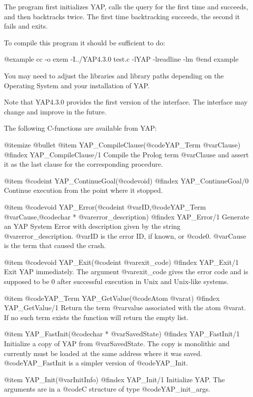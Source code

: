 {{{{{{{{{The program first initializes YAP, calls the query for the
first time and succeeds, and then backtracks twice. The first time
backtracking succeeds, the second it fails and exits.

To compile this program it should be sufficient to do:

@example
cc -o exem -I../YAP4.3.0 test.c -lYAP -lreadline -lm
@end example

You may need to adjust the libraries and library paths depending on the
Operating System and your installation of YAP.

Note that YAP4.3.0 provides the first version of the interface. The
interface may change and improve in the future.

The following C-functions are available from YAP:

@itemize @bullet
@item  YAP_CompileClause(@code{YAP_Term} @var{Clause})
@findex  YAP_CompileClause/1
Compile the Prolog term @var{Clause} and assert it as the last clause
for the corresponding procedure.

@item  @code{int} YAP_ContinueGoal(@code{void})
@findex YAP_ContinueGoal/0
Continue execution from the point where it stopped.

@item  @code{void} YAP_Error(@code{int} @var{ID},@code{YAP_Term} @var{Cause},@code{char *} @var{error_description})
@findex YAP_Error/1
Generate an YAP System Error with description given by the string
@var{error_description}. @var{ID} is the error ID, if known, or
@code{0}. @var{Cause} is the term that caused the crash.

@item  @code{void} YAP_Exit(@code{int} @var{exit_code})
@findex YAP_Exit/1
Exit YAP immediately. The argument @var{exit_code} gives the error code
and is supposed to be 0 after successful execution in Unix and Unix-like
systems.

@item  @code{YAP_Term} YAP_GetValue(@code{Atom} @var{at})
@findex  YAP_GetValue/1
Return the term @var{value} associated with the atom @var{at}. If no
such term exists the function will return the empty list.

@item  YAP_FastInit(@code{char *} @var{SavedState})
@findex  YAP_FastInit/1
Initialize a copy of YAP from @var{SavedState}. The copy is
monolithic and currently must be loaded at the same address where it was
saved. @code{YAP_FastInit} is a simpler version of @code{YAP_Init}.

@item  YAP_Init(@var{InitInfo})
@findex  YAP_Init/1
Initialize YAP. The arguments are in a @code{C}
structure of type @code{YAP_init_args}.

}}}}}}}}}
